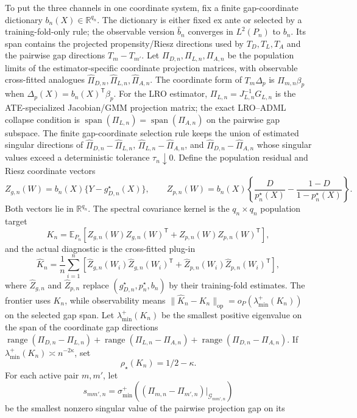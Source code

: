 \documentclass[11pt]{article}
\newcommand{\E}{\mathbb{E}}
\newcommand{\transpose}{\mathsf{T}}
\newcommand{\R}{\mathbb{R}}
\theoremstyle{definition}
\theoremstyle{plain}
\theoremstyle{remark}
\begin{document}
To put the three channels in one coordinate system, fix a finite
gap-coordinate dictionary \(b_n(X)\in\R^{q_n}\).  The dictionary is either
fixed ex ante or selected by a training-fold-only rule; the observable version
\(\hat b_n\) converges in \(L^2(P_n)\) to \(b_n\).  Its span contains the
projected propensity/Riesz directions used by \(T_D,T_L,T_A\) and the pairwise
gap directions \(T_m-T_{m'}\).  Let
\(\Pi_{D,n},\Pi_{L,n},\Pi_{A,n}\) be the population limits of the
estimator-specific coordinate projection matrices, with observable
cross-fitted analogues \(\hat\Pi_{D,n},\hat\Pi_{L,n},\hat\Pi_{A,n}\).  The
coordinate form of \(T_m\Delta_p\) is \(\Pi_{m,n}\beta_p\) when
\(\Delta_p(X)=b_n(X)^\transpose\beta_p\).  For the LRO estimator,
\(\Pi_{L,n}=J_{L,n}^{-1}G_{L,n}\) is the ATE-specialized Jacobian/GMM
projection matrix; the exact LRO--ADML collapse condition is
\(\operatorname{span}(\Pi_{L,n})=\operatorname{span}(\Pi_{A,n})\) on the
pairwise gap subspace.  The finite gap-coordinate selection rule keeps the
union of estimated singular directions of
\(\hat\Pi_{D,n}-\hat\Pi_{L,n}\), \(\hat\Pi_{L,n}-\hat\Pi_{A,n}\), and
\(\hat\Pi_{D,n}-\hat\Pi_{A,n}\) whose singular values exceed a deterministic
tolerance \(\tau_n\downarrow0\).  Define the population residual and Riesz
coordinate vectors
\[
Z_{g,n}(W)=b_n(X)\{Y-g_{D,n}^\star(X)\},\qquad
Z_{p,n}(W)=b_n(X)\left\{\frac{D}{p_n^\star(X)}
-\frac{1-D}{1-p_n^\star(X)}\right\}.
\]
Both vectors lie in \(\R^{q_n}\).  The spectral covariance kernel is the
\(q_n\times q_n\) population target
\[
K_n=\E_{P_n}\!\left[
Z_{g,n}(W)Z_{g,n}(W)^\transpose+
Z_{p,n}(W)Z_{p,n}(W)^\transpose\right],
\]
and the actual diagnostic is the cross-fitted plug-in
\[
\hat K_n=\frac1n\sum_{i=1}^n
\left[
\hat Z_{g,n}(W_i)\hat Z_{g,n}(W_i)^\transpose+
\hat Z_{p,n}(W_i)\hat Z_{p,n}(W_i)^\transpose
\right],
\]
where \(\hat Z_{g,n}\) and \(\hat Z_{p,n}\) replace
\((g_{D,n}^\star,p_n^\star,b_n)\) by their training-fold estimates.  The
frontier uses \(K_n\), while observability means
\(\|\hat K_n-K_n\|_{\mathrm{op}}=o_P(\lambda_{\min}^+(K_n))\) on the selected
gap span.  Let
\(\lambda_{\min}^+(K_n)\) be the smallest positive eigenvalue on the span of the
coordinate gap directions
\(\operatorname{range}(\Pi_{D,n}-\Pi_{L,n})+
\operatorname{range}(\Pi_{L,n}-\Pi_{A,n})+
\operatorname{range}(\Pi_{D,n}-\Pi_{A,n})\).  If
\(\lambda_{\min}^+(K_n)\asymp n^{-2\kappa}\), set
\[
\rho_\star(K_n)=1/2-\kappa.
\]
For each active pair \(m,m'\), let
\[
s_{mm',n}=\sigma_{\min}^+\!\left((\Pi_{m,n}-\Pi_{m',n})\big|_{\mathcal{G}_{mm',n}}\right)
\]
be the smallest nonzero singular value of the pairwise projection gap on its
\end{document}
